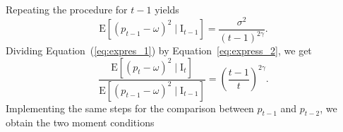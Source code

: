 \documentclass[webpdf,modern,medium]{oup-authoring-template}
\newcommand{\bs}{\boldsymbol}
\theoremstyle{thmstyleone}%
\theoremstyle{thmstyletwo}%
\theoremstyle{thmstylethree}%
\begin{document}
        Repeating the procedure for $t - 1$ yields
        \begin{equation}
        \label{eq:express_2}
            \mathrm{E}\left[\left(p_{t - 1} - \omega\right)^2 \mid \mathrm{I}_{t - 1}\right] = \frac{\sigma^2}{(t - 1)^{2 \gamma}}.
        \end{equation}
        Dividing Equation~(\ref{eq:expres_1}) by Equation~\eqref{eq:express_2}, we get
        \begin{equation*}
            \frac{\mathrm{E}\left[\left(p_t - \omega\right)^2 \mid \mathrm{I}_t\right]}{\mathrm{E}\left[\left(p_{t - 1} - \omega \right)^2 \mid \mathrm{I}_{t - 1}\right]} = \left(\frac{t - 1}{t}\right)^{2 \gamma}.
        \end{equation*}
        Implementing the same steps for the comparison between $p_{t - 1}$ and $p_{t - 2}$, we obtain the two moment conditions
\end{document}
